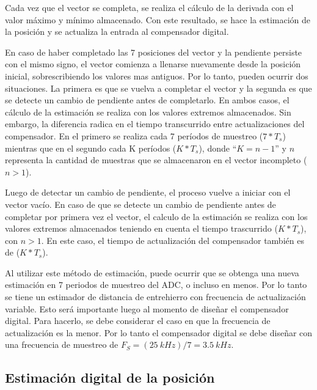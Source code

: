 Cada vez que el vector se completa, se realiza el cálculo de la derivada con el valor máximo y mínimo almacenado. Con este resultado, se hace la estimación de la posición y se actualiza la entrada al compensador digital.

En caso de haber completado las 7 posiciones del vector y la pendiente persiste con el mismo signo, el vector comienza a llenarse nuevamente desde la posición inicial, sobrescribiendo los valores mas antiguos. Por lo tanto, pueden ocurrir dos situaciones. La primera es que se vuelva a completar el vector y la segunda es que se detecte un cambio de pendiente antes de completarlo. En ambos casos, el cálculo de la estimación se realiza con los valores extremos almacenados. Sin embargo, la diferencia radica en el tiempo transcurrido entre actualizaciones del compensador. En el primero se realiza cada 7 períodos de muestreo ($7*T_s$) mientras que en el segundo cada K períodos ($K*T_s$), donde “$K=n-1$” y $n$ representa la cantidad de muestras que se almacenaron en el vector incompleto ($n>1$).

Luego de detectar un cambio de pendiente, el proceso vuelve a iniciar con el vector vacío. En caso de que se detecte un cambio de pendiente antes de completar por primera vez el vector, el calculo de la estimación se realiza con los valores extremos almacenados teniendo en cuenta el tiempo trascurrido ($K*T_s$), con $n>1$. En este caso, el tiempo de actualización del compensador también es de ($K*T_s$).

Al utilizar este método de estimación, puede ocurrir que se obtenga una nueva estimación en 7 periodos de muestreo del ADC, o incluso en menos. Por lo tanto se tiene un estimador de distancia de entrehierro con frecuencia de actualización variable. Esto será importante luego al momento de diseñar el compensador digital. Para hacerlo, se debe considerar el caso en que la frecuencia de actualización es la menor. Por lo tanto el compensador digital se debe diseñar con una frecuencia de muestreo de $F_S=(25\:kHz)/7 = 3.5\:kHz$.








\subsection{Estimación digital de la posición}

